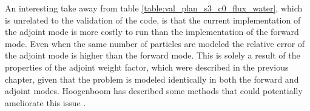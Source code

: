 An interesting take away from table \ref{table:val_plan_s3_c0_flux_water},
which is unrelated to the validation of the code, is that the current 
implementation of the adjoint mode is more costly to run than the implementation
of the forward mode. Even when the same number of particles are modeled the 
relative error of the adjoint mode is higher than the forward mode. This is 
solely a result of the properties of the adjoint weight factor, which were 
described in the previous chapter, given that the problem is modeled 
identically in both the forward and adjoint modes. Hoogenboom has described
some methods that could potentially ameliorate this issue 
\citep{hoogenboom_adjoint_1977}.
